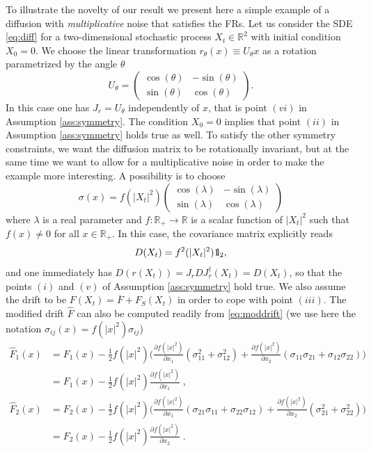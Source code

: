 \documentclass[a4paper,11pt]{article}
\numberwithin{equation}{section}
\newcommand{\bbbone}{\mathchoice {\rm 1\mskip-4mu l} {\rm 1\mskip-4mu l}
{\rm 1\mskip-4.5mu l} {\rm 1\mskip-5mu l}}
\begin{document}
To illustrate the novelty of our result we present here a simple example of a diffusion with \emph{multiplicative} noise that satisfies the FRs.
Let us consider the SDE \eqref{eq:diff} for a two-dimensional stochastic process $X_t \in \mathbb{R}^2$ with initial condition $X_0=0$. We choose the linear transformation $r_\theta (x) \equiv U_\theta x$ as a rotation parametrized by the angle $\theta$
\begin{equation}
U_\theta = 
\begin{pmatrix}
\cos(\theta)  &-\sin(\theta) \\
\sin(\theta)   & \cos(\theta) 
\end{pmatrix}.
\end{equation}
In this case one has $J_r = U_\theta$ independently of $x$, that is point $(vi)$ in Assumption \ref{ass:symmetry}. The condition $X_0=0$ implies that point $(ii)$ in Assumption \ref{ass:symmetry} holds true as well.
To satisfy the other symmetry constraints, we want the diffusion matrix to be rotationally invariant, but at the same time we want to allow for a multiplicative noise in order to make the example more interesting. A possibility is to choose 
\begin{equation}
    \sigma(x) = f(|X_t|^2) 
    \begin{pmatrix}
\cos(\lambda)  &-\sin(\lambda) \\
\sin(\lambda)   & \cos(\lambda) 
    \end{pmatrix}
\end{equation}
where $\lambda$ is a real parameter and $f: \mathbb{R}_+ \to \mathbb{R}$ is a scalar function of $|X_t|^2$ such that $f(x)\neq 0$ for all $x \in \mathbb{R}_+$. In this case, the covariance matrix explicitly reads
\begin{equation*}
    D(X_t) = f^2(|X_t|^2) \bbbone_2 ,
\end{equation*}
and one immediately has $D(r(X_t))=J_r D J_r^\dag (X_t)=D(X_t)$, so that the points $(i)$ and $(v)$ of Assumption \ref{ass:symmetry} hold true. We also assume the drift to be $F(X_t) = \overline{F} + F_S(X_t)$ in order to cope with point $(iii)$. The modified drift $\widehat{F}$ can also be computed readily from \eqref{eq:moddrift} (we use here the notation $\sigma_{ij}(x)= f(|x|^2)\sigma_{ij}$)
\begin{align}
    \widehat{F}_1(x) &= F_1(x) - \frac{1}{2} f(|x|^2) \Big( \frac{\partial f(|x|^2)}{\partial x_1} (\sigma_{11}^2 + \sigma_{12}^2) + \frac{\partial f(|x|^2)}{\partial x_2} (\sigma_{11}\sigma_{21} + \sigma_{12}\sigma_{22})  \Big) \nonumber \\
    &= F_1(x) - \frac{1}{2} f(|x|^2) \frac{\partial f(|x|^2)}{\partial x_1} \;, \\
    \widehat{F}_2(x) &= F_2(x) - \frac{1}{2} f(|x|^2) \Big( \frac{\partial f(|x|^2)}{\partial x_1} (\sigma_{21}\sigma_{11} + \sigma_{22}\sigma_{12}) + \frac{\partial f(|x|^2)}{\partial x_2} (\sigma_{21}^2 + \sigma_{22}^2)  \Big) \nonumber \\
    &= F_2(x) - \frac{1}{2} f(|x|^2)  \frac{\partial f(|x|^2)}{\partial x_2} \;.
\end{align}
\end{document}
